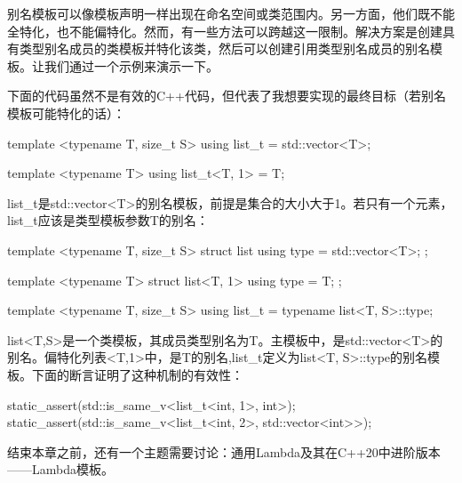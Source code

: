 别名模板可以像模板声明一样出现在命名空间或类范围内。另一方面，他们既不能全特化，也不能偏特化。然而，有一些方法可以跨越这一限制。解决方案是创建具有类型别名成员的类模板并特化该类，然后可以创建引用类型别名成员的别名模板。让我们通过一个示例来演示一下。

下面的代码虽然不是有效的C++代码，但代表了我想要实现的最终目标（若别名模板可能特化的话）：

\begin{cpp}
template <typename T, size_t S>
using list_t = std::vector<T>;

template <typename T>
using list_t<T, 1> = T;
\end{cpp}

list\_t是std::vector<T>的别名模板，前提是集合的大小大于1。若只有一个元素，list\_t应该是类型模板参数T的别名：

\begin{cpp}
template <typename T, size_t S>
struct list
{
	using type = std::vector<T>;
};

template <typename T>
struct list<T, 1>
{
	using type = T;
};

template <typename T, size_t S>
using list_t = typename list<T, S>::type;
\end{cpp}

list<T,S>是一个类模板，其成员类型别名为T。主模板中，是std::vector<T>的别名。偏特化列表<T,1>中，是T的别名,list\_t定义为list<T, S>::type的别名模板。下面的断言证明了这种机制的有效性：

\begin{cpp}
static_assert(std::is_same_v<list_t<int, 1>, int>);
static_assert(std::is_same_v<list_t<int, 2>,
std::vector<int>>);
\end{cpp}

结束本章之前，还有一个主题需要讨论：通用Lambda及其在C++20中进阶版本——Lambda模板。




















